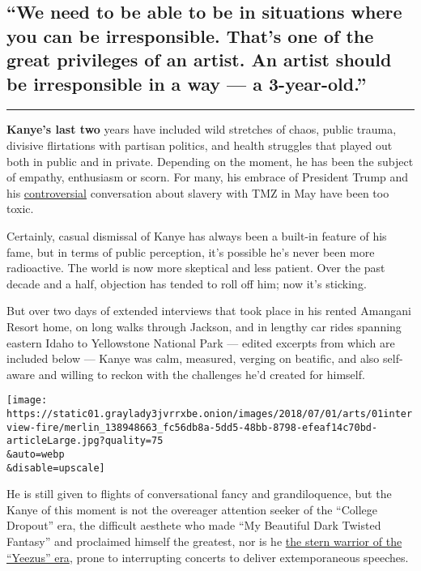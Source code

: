 \hypertarget{we-need-to-be-able-to-be-in-situations-where-you-can-be-irresponsible-thats-one-of-the-great-privileges-of-an-artist-an-artist-should-be-irresponsible-in-a-way--a-3-year-old}{%
\subsection{``We need to be able to be in situations where you can be
irresponsible. That's one of the great privileges of an artist. An
artist should be irresponsible in a way --- a
3-year-old.''}\label{we-need-to-be-able-to-be-in-situations-where-you-can-be-irresponsible-thats-one-of-the-great-privileges-of-an-artist-an-artist-should-be-irresponsible-in-a-way--a-3-year-old}}

\begin{center}\rule{0.5\linewidth}{\linethickness}\end{center}

\textbf{Kanye's last two} years have included wild stretches of chaos,
public trauma, divisive flirtations with partisan politics, and health
struggles that played out both in public and in private. Depending on
the moment, he has been the subject of empathy, enthusiasm or scorn. For
many, his embrace of President Trump and his
\href{https://www.nytimes3xbfgragh.onion/2018/05/01/arts/music/kanye-west-charlamagne-interview-tmz.html}{controversial}
conversation about slavery with TMZ in May have been too toxic.

Certainly, casual dismissal of Kanye has always been a built-in feature
of his fame, but in terms of public perception, it's possible he's never
been more radioactive. The world is now more skeptical and less patient.
Over the past decade and a half, objection has tended to roll off him;
now it's sticking.

But over two days of extended interviews that took place in his rented
Amangani Resort home, on long walks through Jackson, and in lengthy car
rides spanning eastern Idaho to Yellowstone National Park --- edited
excerpts from which are included below --- Kanye was calm, measured,
verging on beatific, and also self-aware and willing to reckon with the
challenges he'd created for himself.

\texttt{[image: https://static01.graylady3jvrrxbe.onion/images/2018/07/01/arts/01interview-fire/merlin\_138948663\_fc56db8a-5dd5-48bb-8798-efeaf14c70bd-articleLarge.jpg?quality=75\\\&auto=webp\\\&disable=upscale]}

He is still given to flights of conversational fancy and grandiloquence,
but the Kanye of this moment is not the overeager attention seeker of
the ``College Dropout'' era, the difficult aesthete who made ``My
Beautiful Dark Twisted Fantasy'' and proclaimed himself the greatest,
nor is he
\href{https://www.nytimes3xbfgragh.onion/2013/06/16/arts/music/kanye-west-talks-about-his-career-and-album-yeezus.html}{the
stern warrior of the ``Yeezus'' era}, prone to interrupting concerts to
deliver extemporaneous speeches.

